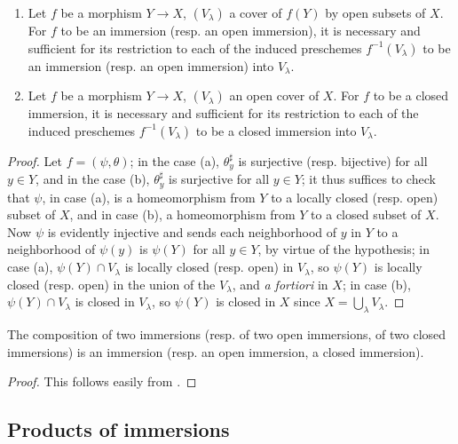 \begin{cor}[4.2.4]
\label{1.4.2.4}
\medskip\noindent
\begin{enumerate}[label={\rm(\alph*)}]
  \item Let $f$ be a morphism $Y\to X$, $(V_\lambda)$ a cover of $f(Y)$ by open subsets of $X$.
    For $f$ to be an immersion (resp. an open immersion), it is necessary and sufficient
    for its restriction to each of the induced preschemes $f^{-1}(V_\lambda)$ to be an immersion (resp. an open immersion) into $V_\lambda$.
  \item Let $f$ be a morphism $Y\to X$, $(V_\lambda)$ an open cover of $X$.
    For $f$ to be a closed immersion, it is necessary and sufficient for its restriction to each of the induced preschemes $f^{-1}(V_\lambda)$ to be a closed immersion into $V_\lambda$.
\end{enumerate}
\end{cor}

\begin{proof}
\label{proof-1.4.2.4}
Let $f=(\psi,\theta)$; in the case (a), $\theta_y^\sharp$ is surjective (resp. bijective) for all $y\in Y$, and in the case (b), $\theta_y^\sharp$ is surjective for all $y\in Y$; it thus suffices to check that $\psi$, in case (a), is a homeomorphism from $Y$ to a locally closed (resp. open) subset of $X$, and in case (b), a homeomorphism from $Y$ to a closed subset of $X$.
Now $\psi$ is evidently injective and sends each neighborhood of $y$ in $Y$ to a neighborhood of $\psi(y)$ is $\psi(Y)$ for all $y\in Y$, by virtue of the hypothesis; in case (a), $\psi(Y)\cap V_\lambda$ is locally closed (resp. open) in $V_\lambda$, so $\psi(Y)$ is locally closed (resp. open) in the union of the $V_\lambda$, and \emph{a fortiori} in $X$; in case (b), $\psi(Y)\cap V_\lambda$ is closed in $V_\lambda$, so $\psi(Y)$ is closed in $X$ since $X=\bigcup_\lambda V_\lambda$.
\end{proof}

\begin{prop}[4.2.5]
\label{1.4.2.5}
The composition of two immersions (resp. of two open immersions, of two closed immersions) is an immersion (resp. an open immersion, a closed immersion).
\end{prop}

\begin{proof}
\label{proof-1.4.2.5}
This follows easily from .
\end{proof}

\subsection{Products of immersions}
\label{subsection-products-of-immersions}

